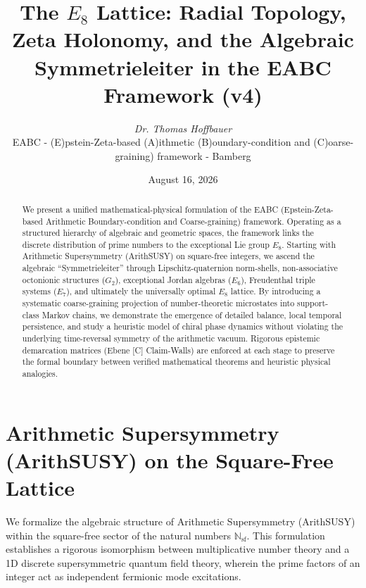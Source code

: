 \documentclass[11pt,a4paper]{article}
\title{\textbf{The $E_8$ Lattice: Radial Topology, Zeta Holonomy, and the Algebraic Symmetrieleiter in the EABC Framework (v4)}}
\author{\textit{Dr. Thomas Hoffbauer} \\ \small EABC - (E)pstein-Zeta-based (A)ithmetic (B)oundary-condition and (C)oarse-graining) framework -  Bamberg }
\date{August 16, 2026}
\theoremstyle{definition}
\begin{document}
	
	\maketitle
	
	\begin{abstract}
		We present a unified mathematical-physical formulation of the EABC (Epstein-Zeta-based Arithmetic Boundary-condition and Coarse-graining) framework. Operating as a structured hierarchy of algebraic and geometric spaces, the framework links the discrete distribution of prime numbers to the exceptional Lie group $E_8$. Starting with Arithmetic Supersymmetry (ArithSUSY) on square-free integers, we ascend the algebraic ``Symmetrieleiter'' through Lipschitz-quaternion norm-shells, non-associative octonionic structures ($G_2$), exceptional Jordan algebras ($E_6$), Freudenthal triple systems ($E_7$), and ultimately the universally optimal $E_8$ lattice. By introducing a systematic coarse-graining projection of number-theoretic microstates into support-class Markov chains, we demonstrate the emergence of detailed balance, local temporal persistence, and study a heuristic model of chiral phase dynamics without violating the underlying time-reversal symmetry of the arithmetic vacuum. Rigorous epistemic demarcation matrices (Ebene [C] Claim-Walls) are enforced at each stage to preserve the formal boundary between verified mathematical theorems and heuristic physical analogies.
	\end{abstract}
	
	\tableofcontents
	\newpage
	
	
	\section{Arithmetic Supersymmetry (ArithSUSY) on the Square-Free Lattice}
	\label{sec:arith_susy}
	
	We formalize the algebraic structure of Arithmetic Supersymmetry (ArithSUSY) within the square-free sector of the natural numbers $\mathbb{N}_{\text{sf}}$. This formulation establishes a rigorous isomorphism between multiplicative number theory and a 1D discrete supersymmetric quantum field theory, wherein the prime factors of an integer act as independent fermionic mode excitations.
	
\end{document}
